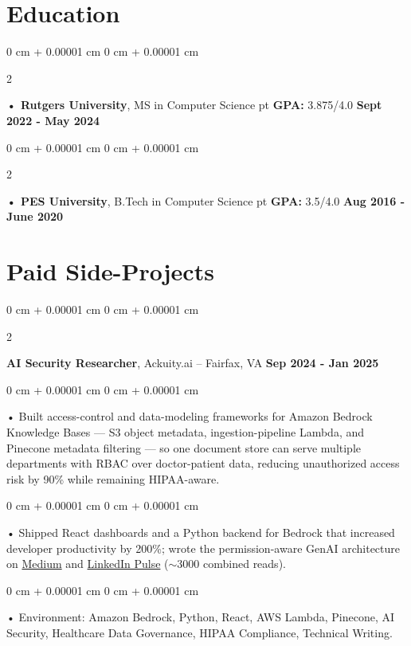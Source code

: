\documentclass[10pt, letterpaper]{article}
\newenvironment{onecolentry}{
    \begin{adjustwidth}{
        0 cm + 0.00001 cm
    }{
        0 cm + 0.00001 cm
    }
}{
    \end{adjustwidth}
} %
\newenvironment{twocolentry}[2][]{
    \onecolentry
    \def\secondColumn{#2}
    \setcolumnwidth{\fill, 4.5 cm}
    \begin{paracol}{2}
}{
    \switchcolumn \raggedleft \secondColumn
    \end{paracol}
    \endonecolentry
} %
\begin{document}
        \section{Education}
        \vspace{2 pt }
        \begin{twocolentry}{
            \textbf{Sept 2022 - May 2024}
        }
            \textbf{ • Rutgers University}, MS in Computer Science  pt \textbf{GPA:} 3.875/4.0  \end{twocolentry}

        \begin{twocolentry}{
            \textbf{Aug 2016 - June 2020}
        }
            \textbf{ • PES University}, B.Tech in Computer Science  pt \textbf{GPA:} 3.5/4.0  \end{twocolentry}

                        \vspace{0.4cm}
    \section{Paid Side-Projects}
            \vspace{2 pt }
                    \begin{twocolentry}{
            \textbf{Sep 2024 - Jan 2025}
        }
            \textbf{AI Security Researcher}, Ackuity.ai -- Fairfax, VA\end{twocolentry}

        \begin{onecolentry}
             • Built access-control and data-modeling frameworks for Amazon Bedrock Knowledge Bases --- S3 object metadata, ingestion-pipeline Lambda, and Pinecone metadata filtering --- so one document store can serve multiple departments with RBAC over doctor-patient data, reducing unauthorized access risk by 90\% while remaining HIPAA-aware.
        \end{onecolentry}
        \begin{onecolentry}
             • Shipped React dashboards and a Python backend for Bedrock that increased developer productivity by 200\%; wrote the permission-aware GenAI architecture on \href{https://medium.com/@sreenikethaathreya/building-a-permission-aware-genai-application-on-amazon-bedrock-8fdc2410dd43}{Medium} and \href{https://www.linkedin.com/pulse/building-permission-aware-genai-application-amazon-bedrock-aathreya-g7nme/}{LinkedIn Pulse} ($\sim$3000 combined reads).
        \end{onecolentry}
        \begin{onecolentry}
             • Environment: Amazon Bedrock, Python, React, AWS Lambda, Pinecone, AI Security, Healthcare Data Governance, HIPAA Compliance, Technical Writing.
        \end{onecolentry}
\end{document}
